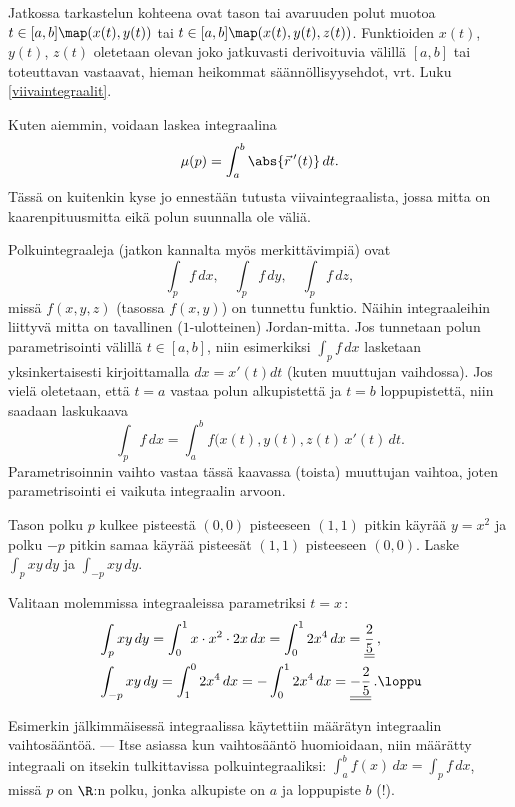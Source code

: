Jatkossa tarkastelun kohteena ovat tason tai avaruuden polut muotoa $t\in[a,b]\map(x(t),y(t))$
tai $t\in[a,b]\map(x(t),y(t),z(t))$. Funktioiden $x(t)$, $y(t)$, $z(t)$ oletetaan olevan joko
jatkuvasti derivoituvia välillä  $[a,b]$ tai toteuttavan vastaavat, hieman heikommat
säännöllisyysehdot, vrt. Luku \ref{viivaintegraalit}. 

Kuten aiemmin, voidaan laskea  integraalina
\[
\mu(p)=\int_a^b \abs{\vec r\,'(t)}\,dt.
\]
Tässä on kuitenkin kyse jo ennestään tutusta viivaintegraalista, jossa mitta on
kaarenpituusmitta eikä polun suunnalla ole väliä.

Polkuintegraaleja (jatkon kannalta myös merkittävimpiä) ovat
\begin{equation} \label{polkuintegraaleja}
\int_p f\,dx, \quad \int_p f\,dy, \quad \int_p f\,dz, \tag{$\star$}
\end{equation}
missä $f(x,y,z)$ (tasossa $f(x,y)$) on tunnettu funktio. Näihin integraaleihin liittyvä
mitta on tavallinen ($1$-ulotteinen) Jordan-mitta. Jos tunnetaan polun parametrisointi
välillä $t\in[a,b]$, niin esimerkiksi $\int_p f\,dx$ lasketaan yksinkertaisesti kirjoittamalla
$dx=x'(t)dt$ (kuten muuttujan vaihdossa). Jos vielä oletetaan, että $t=a$ vastaa polun
alkupistettä ja $t=b$ loppupistettä, niin saadaan laskukaava
\[
\int_p f\,dx = \int_a^b f(x(t),y(t),z(t)\,x'(t)\,dt.
\]
Parametrisoinnin vaihto vastaa tässä kaavassa (toista) muuttujan vaihtoa, joten parametrisointi
ei vaikuta integraalin arvoon.
\begin{Exa} Tason polku $p$ kulkee pisteestä $(0,0)$ pisteeseen $(1,1)$ pitkin käyrää $y=x^2$
ja polku $-p$ pitkin samaa käyrää pisteesät $(1,1)$ pisteeseen $(0,0)$. Laske
$\int_p xy\,dy$ ja $\int_{-p} xy\,dy$.
\end{Exa}
\ratk Valitaan molemmissa integraaleissa parametriksi $t=x$\,:
\begin{align*}
&\int_p xy\,dy     = \int_0^1 x \cdot x^2 \cdot 2x\,dx = \int_0^1 2x^4\,dx
                  = \underline{\underline{\frac{2}{5}}}\,, \\
&\int_{-p} xy\,dy  = \int_1^0 2x^4\,dx = -\int_0^1 2x^4\,dx 
                  = \underline{\underline{-\frac{2}{5}}}\,. \loppu
\end{align*}

Esimerkin jälkimmäisessä integraalissa käytettiin määrätyn integraalin vaihtosääntöä. --- Itse
asiassa kun vaihtosääntö huomioidaan, niin määrätty integraali on itsekin tulkittavissa
polkuintegraaliksi: $\int_a^b f(x)\,dx = \int_p f\,dx$, missä $p$ on $\R$:n polku, jonka
alkupiste on $a$ ja loppupiste $b$ (!).

